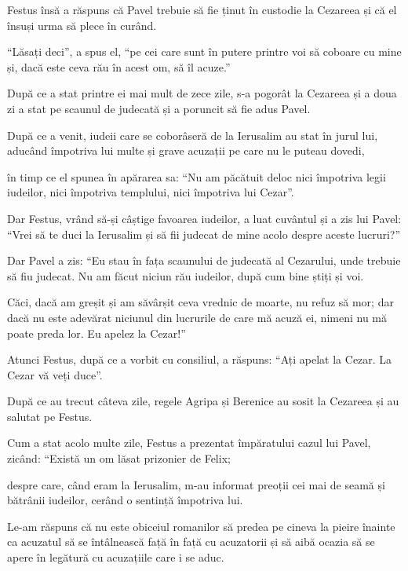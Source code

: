 {Festus însă a răspuns că Pavel trebuie să fie ținut în custodie la Cezareea și că el însuși urma să plece în curând.

“Lăsați deci”, a spus el, “pe cei care sunt în putere printre voi să coboare cu mine și, dacă este ceva rău în acest om, să îl acuze.”


\par }{\PP {}După ce a stat printre ei mai mult de zece zile, s-a pogorât la Cezareea și a doua zi a stat pe scaunul de judecată și a poruncit să fie adus Pavel.

După ce a venit, iudeii care se coborâseră de la Ierusalim au stat în jurul lui, aducând împotriva lui multe și grave acuzații pe care nu le puteau dovedi,

în timp ce el spunea în apărarea sa: “Nu am păcătuit deloc nici împotriva legii iudeilor, nici împotriva templului, nici împotriva lui Cezar”.


\par }{\PP {}Dar Festus, vrând să-și câștige favoarea iudeilor, a luat cuvântul și a zis lui Pavel: “Vrei să te duci la Ierusalim și să fii judecat de mine acolo despre aceste lucruri?”


\par }{\PP {}Dar Pavel a zis: “Eu stau în fața scaunului de judecată al Cezarului, unde trebuie să fiu judecat. Nu am făcut niciun rău iudeilor, după cum bine știți și voi.

Căci, dacă am greșit și am săvârșit ceva vrednic de moarte, nu refuz să mor; dar dacă nu este adevărat niciunul din lucrurile de care mă acuză ei, nimeni nu mă poate preda lor. Eu apelez la Cezar!”


\par }{\PP {}Atunci Festus, după ce a vorbit cu consiliul, a răspuns: “Ați apelat la Cezar. La Cezar vă veți duce”.


\par }{\PP {}După ce au trecut câteva zile, regele Agripa și Berenice au sosit la Cezareea și au salutat pe Festus.

Cum a stat acolo multe zile, Festus a prezentat împăratului cazul lui Pavel, zicând: “Există un om lăsat prizonier de Felix;

despre care, când eram la Ierusalim, m-au informat preoții cei mai de seamă și bătrânii iudeilor, cerând o sentință împotriva lui.

Le-am răspuns că nu este obiceiul romanilor să predea pe cineva la pieire înainte ca acuzatul să se întâlnească față în față cu acuzatorii și să aibă ocazia să se apere în legătură cu acuzațiile care i se aduc.

}
